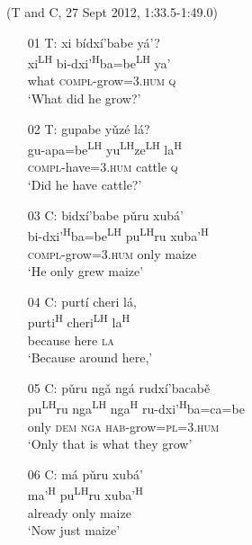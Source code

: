 \ea (T and C, 27 Sept 2012, 1:33.5-1:49.0)
\begin{itemize}

\item[01 T:]
xi b\'{i}dx\'{i}'babe y\'{a}'? \\
xi\textsuperscript{LH} bi-dxi'\textsuperscript{H}ba=be\textsuperscript{LH} ya' \\
what \textsc{compl}-grow=\textsc{3.hum} \textsc{q} \\
\glt `What did he grow?'



\item[02 T:]
gupabe y\v{u}z\'{e} l\'{a}? \\
gu-apa=be\textsuperscript{LH} yu\textsuperscript{LH}ze\textsuperscript{LH} la\textsuperscript{H} \\
\textsc{compl}-have=\textsc{3.hum} cattle \textsc{q} \\
\glt `Did he have cattle?'


\item[03 C:] 
\glll bidx\'{i}'babe p\v{u}ru xub\'{a}' \\
bi-dxi'\textsuperscript{H}ba=be\textsuperscript{LH} pu\textsuperscript{LH}ru xuba'\textsuperscript{H} \\
\textsc{compl}-grow=\textsc{3.hum} only maize \\
\glt `He only grew maize'  


\item[04 C:] 
\glll purt\'{i} cheri l\'{a},  \\
purti\textsuperscript{H} cheri\textsuperscript{LH} la\textsuperscript{H}  \\
because here \textsc{la} \\
\glt `Because around here,'


\item[05 C:] 
\glll p\v{u}ru ng\v{a} ng\'{a} rudx\'{i}'bacab\v{e} \\
pu\textsuperscript{LH}ru nga\textsuperscript{LH} nga\textsuperscript{H} ru-dxi'\textsuperscript{H}ba=ca=be \\
only \textsc{dem} \textsc{nga} \textsc{hab}-grow=\textsc{pl=3.hum} \\
\glt `Only that is what they grow' 


\item[06 C:]
\glll m\'{a} p\v{u}ru xub\'{a}'  \\
ma'\textsuperscript{H} pu\textsuperscript{LH}ru xuba'\textsuperscript{H}   \\
already only maize \\
\glt `Now just maize'  



\end{itemize}
